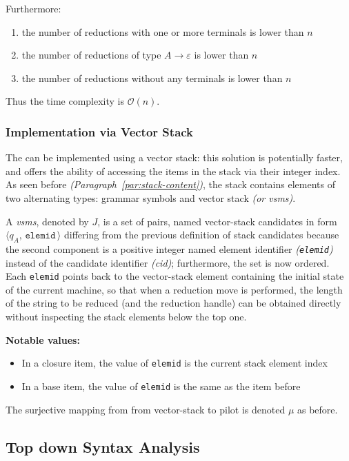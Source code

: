 \documentclass[english]{article}
\begin{document}
Furthermore:
\begin{enumerate}
  \item the number of reductions with one or more terminals is lower than \(n\)
  \item the number of reductions of type \(A \rightarrow \varepsilon\) is lower than \(n\)
  \item the number of reductions without any terminals is lower than \(n\)
\end{enumerate}

Thus the time complexity is \(\mathcal{O}(n)\).

\subsubsection{Implementation via Vector Stack}

The \PDA can be implemented using a vector stack: this solution is potentially faster, and offers the ability of accessing the items in the stack via their integer index.
As seen before \textit{(Paragraph~\ref{par:stack-content})}, the stack contains elements of two alternating types: grammar symbols and vector stack \mstates \textit{(or vsms)}.

A \textit{vsms}, denoted by \(J\), is a set of pairs, named vector-stack candidates in form \(\langle q_A, \, \texttt{elemid} \, \rangle\) differing from the previous definition of stack candidates because the second component is a positive integer named element identifier \textit{(\texttt{elemid})} instead of the candidate identifier \textit{(cid)};
furthermore, the set is now ordered.
Each \texttt{elemid} points back to the vector-stack element containing the initial state of the current machine, so that when a reduction move is performed, the length of the string to be reduced (and the reduction handle) can be obtained directly without inspecting the stack elements below the top one.

\textbf{Notable values:}
\begin{itemize}
  \item In a closure item, the value of \texttt{elemid} is the current stack element index
  \item In a base item, the value of \texttt{elemid} is the same as the item before
\end{itemize}

\bigskip
The surjective mapping from from vector-stack \mstates to pilot \mstates is denoted \(\mu\) as before.

\subsection{Top down Syntax Analysis}
\label{sec:top-down}
\end{document}
